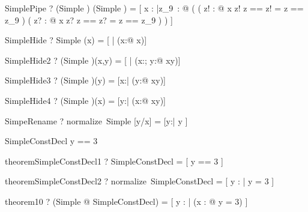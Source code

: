 \begin{theorem}{SimplePipe}
  \vdash? (Simple \land [z!:\nat]) \pipe (Simple \land [z?:\nat]) =
	  [ x : \arithmos
		|\exists z_{9}~: \arithmos @
		   ( ( \exists z! : \arithmos @
			         x \in \nat \land z! \in \nat \land \lblot z == z! \rblot = \lblot z == z_{9} \rblot )
				 \land
				 ( \exists z? : \arithmos @
				       x \in \nat \land z? \in \nat \land \lblot z == z? \rblot = \lblot z == z_{9} \rblot ) ) ]
\end{theorem}

\begin{theorem}{SimpleHide}
  \vdash? Simple \hide (x) = [ | (\exists x:\arithmos @ x\in\nat)]
\end{theorem}

\begin{theorem}{SimpleHide2}
  \vdash? (Simple )\hide(x,y) =
                [ | (\exists x:\arithmos; y:\arithmos @ x\in\nat \land y\in\nat)]
\end{theorem}

\begin{theorem}{SimpleHide3}
  \vdash? (Simple )\hide(y) =
          [x:\arithmos | (\exists y:\arithmos @ x\in\nat \land y\in\nat)]
\end{theorem}

\begin{theorem}{SimpleHide4}
  \vdash? (Simple )\hide(x) =
          [y:\arithmos | (\exists x:\arithmos @ x\in\nat \land y\in\nat)]
\end{theorem}

\begin{theorem}{SimpeRename}
  \vdash? normalize~Simple [y/x] = [y:\arithmos | y \in \nat]
\end{theorem}

\begin{schema}{SimpleConstDecl}
  y == 3
\end{schema}

\begin{theorem}{theoremSimpleConstDecl1}
  \vdash? SimpleConstDecl =
    [ y == 3 ]
\end{theorem}

\begin{theorem}{theoremSimpleConstDecl2}
  \vdash? normalize~SimpleConstDecl =
    [ y : \arithmos | y = 3 ]
\end{theorem}

\begin{theorem}{theorem10}
  \vdash? (\exists Simple @ SimpleConstDecl) =
    [ y : \arithmos |
      (\exists x : \nat @ y = 3) ]
\end{theorem}



